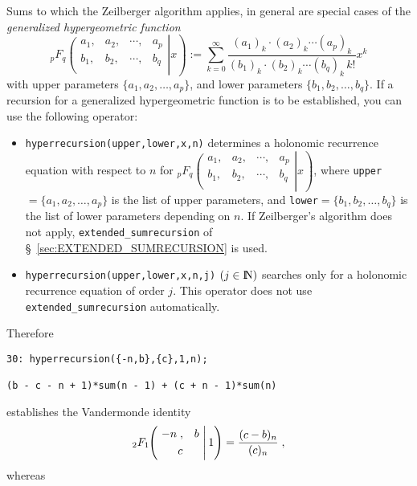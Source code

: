Sums to which the Zeilberger algorithm applies, in general are
special cases of the {\sl generalized hypergeometric function}
\[
_{p}F_{q}\left.\left(\begin{array}{cccc}
a_{1},&a_{2},&\cdots,&a_{p}\\
b_{1},&b_{2},&\cdots,&b_{q}\\
            \end{array}\right| x\right)
:=
\sum_{k=0}^\infty \frac
{(a_{1})_{k}\cdot(a_{2})_{k}\cdots(a_{p})_{k}}
{(b_{1})_{k}\cdot(b_{2})_{k}\cdots(b_{q})_{k}\,k!}x^{k}
\label{eq:coefficientformula}
\]
with upper parameters $\{a_{1}, a_{2}, \ldots, a_{p}\}$, and lower
parameters $\{b_{1}, b_{2}, \ldots, b_{q}\}$. If a recursion for a
generalized hypergeometric function is to be established, you can use
the following \REDUCE{} operator:
\begin{itemize}
\item
{\tt hyperrecursion(upper,lower,x,n)} determines a holonomic recurrence
equation with respect to $n$ for
$_{p}F_{q}\left.\left(\begin{array}{cccc}
a_{1},&a_{2},&\cdots,&a_{p}\\
b_{1},&b_{2},&\cdots,&b_{q}\\
            \end{array}\right| x\right)
$, where {\tt upper}$=\{a_{1}, a_{2}, \ldots, a_{p}\}$
is the list of upper parameters, and
{\tt lower}$=\{b_{1}, b_{2}, \ldots, b_{q}\}$
is the list of lower parameters depending on $n$. If Zeilberger's algorithm
does not apply, {\tt extended\verb+_+sumrecursion}
of \S~\ref{sec:EXTENDED_SUMRECURSION} is used.
\item
{\tt hyperrecursion(upper,lower,x,n,j)} $(j\in\N)$
searches only for a holonomic recurrence equation of order $j$. This
operator does not use {\tt extended\verb+_+sumrecursion} automatically.
\end{itemize}
Therefore

{\small
\begin{verbatim}
30: hyperrecursion({-n,b},{c},1,n);

(b - c - n + 1)*sum(n - 1) + (c + n - 1)*sum(n)
\end{verbatim}
}\noindent
establishes the Vandermonde identity
\[
_2 F_1\left.
\!\!
\left(
\!\!\!\!
\begin{array}{c}
\multicolumn{1}{c}{\begin{array}{cc} -n\;, & b \end{array}}\\[1mm]
\multicolumn{1}{c}{ c}
            \end{array}
\!\!\!\!
\right| 1\right)
=\frac{(c-b)_n}{(c)_n}
\;,
\]
whereas

